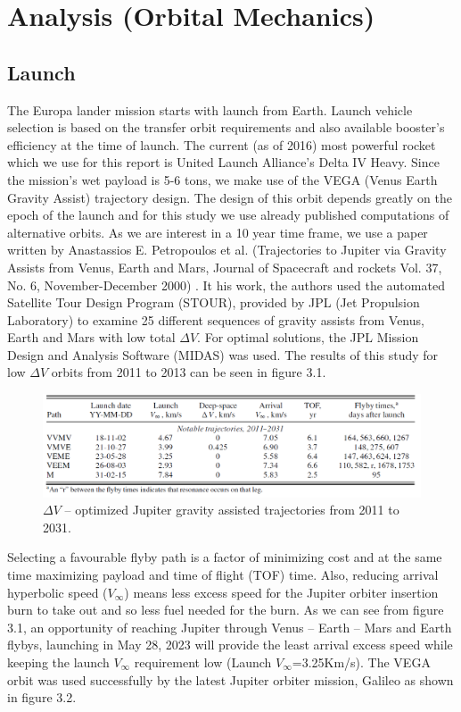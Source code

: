 \section{Analysis (Orbital Mechanics)}
\subsection{Launch}
The Europa lander mission starts with launch from Earth. Launch vehicle selection is based on the transfer orbit requirements and also available booster’s efficiency at the time of launch. The current (as of 2016) most powerful rocket which we use for this report is United Launch Alliance’s Delta IV Heavy. Since the mission’s wet payload is 5-6 tons, we make use of the VEGA (Venus Earth Gravity Assist) 
trajectory design. The design of this orbit depends greatly on the epoch of the launch and for this study we use already published computations of alternative orbits. As we are interest in a 10 year time frame, we use a paper written by Anastassios E. Petropoulos et al. (Trajectories to Jupiter via Gravity Assists from Venus, Earth and Mars, Journal of Spacecraft and rockets Vol. 37, No. 6, November-December 2000)
. It his work, the authors used the automated Satellite Tour Design Program (STOUR), provided by JPL (Jet Propulsion Laboratory) to examine 25 different sequences of gravity assists from Venus, Earth and Mars with low total $\Delta V$. For optimal solutions, the JPL Mission Design and Analysis Software (MIDAS) was used. The results of this study for low $\Delta V$ orbits from 2011 to 2013 can be seen in figure 3.1.
\begin{figure}[h!]
\centering
\includegraphics[width=1\textwidth]{figures/Orbiter/traj.png}
\caption{$\Delta V$ – optimized Jupiter gravity assisted trajectories from 2011 to 2031. \cite{petropoulos2000a}}
\end{figure}
Selecting a favourable flyby path is a factor of minimizing cost and at the same time maximizing payload and time of flight (TOF) time. Also, reducing arrival hyperbolic speed ($V_{\infty}$) means less excess speed for the Jupiter orbiter insertion burn to take out and so less fuel needed for the burn. As we can see from figure 3.1, an opportunity of reaching Jupiter through Venus – Earth – Mars and Earth flybys, launching in May 28, 2023 will provide the least arrival excess speed while keeping the launch $V_{\infty}$ requirement low (Launch $V_{\infty}$=3.25Km/s). The VEGA orbit was used successfully by the latest Jupiter orbiter mission, Galileo as shown in figure 3.2.
